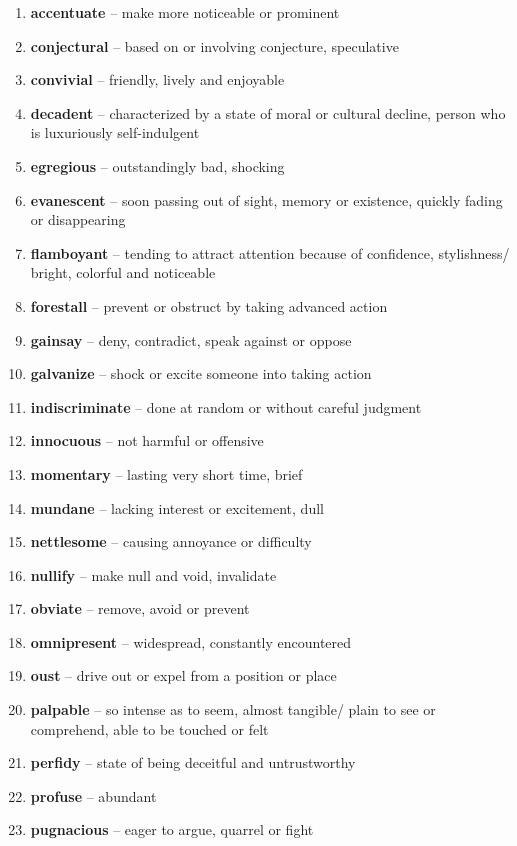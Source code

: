 \begin{enumerate}[wide,labelindent=0pt]
\item \textbf{accentuate} -- make more noticeable or prominent
\item \textbf{conjectural} -- based on or involving conjecture, speculative
\item \textbf{convivial} -- friendly, lively and enjoyable
\item \textbf{decadent} -- characterized by a state of moral or cultural decline, person who is luxuriously self-indulgent
\item \textbf{egregious} -- outstandingly bad, shocking
\item \textbf{evanescent} -- soon passing out of sight, memory or existence, quickly fading or disappearing
\item \textbf{flamboyant} -- tending to attract attention because of confidence, stylishness/ bright, colorful and noticeable
\item \textbf{forestall} -- prevent or obstruct by taking advanced action
\item \textbf{gainsay} -- deny, contradict, speak against or oppose
\item \textbf{galvanize} -- shock or excite someone into taking action
\item \textbf{indiscriminate} -- done at random or without careful judgment
\item \textbf{innocuous} -- not harmful or offensive
\item \textbf{momentary} -- lasting very short time, brief
\item \textbf{mundane} -- lacking interest or excitement, dull
\item \textbf{nettlesome} -- causing annoyance or difficulty
\item \textbf{nullify} -- make null and void, invalidate
\item \textbf{obviate} -- remove, avoid or prevent
\item \textbf{omnipresent} -- widespread, constantly encountered
\item \textbf{oust} -- drive out or expel from a position or place
\item \textbf{palpable} -- so intense as to seem, almost tangible/ plain to see or comprehend, able to be touched or felt
\item \textbf{perfidy} -- state of being deceitful and untrustworthy
\item \textbf{profuse} -- abundant
\item \textbf{pugnacious} -- eager to argue, quarrel or fight

\end{enumerate}
